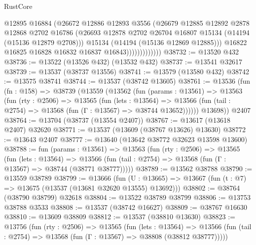 \begin{lexlean}{RustCore}
\begin{coremodule}
                            @12895
                            @16884
                            (@26672
                              @12886
                              @12893
                              @3556
                              (@26679
                                @12885
                                @12892
                                @2878
                                @12868
                                @2702
                                @16786
                                (@26693
                                  @12878
                                  @2702
                                  @26704
                                  @16807
                                  @15134
                                  (@14194 (@15136 @12879 @2708)))
                                @15134
                                (@14194 (@15136 @12869 @12885)))
                              @16822
                              @16825
                              @16828
                              @16832
                              @16837
                              @16843)))))))))))))
@38732 := @13520 @432
@38736 := @13522 (@13526 @432) (@13532 @432)
@38737 := @13541 @32617
@38739 := @13537 (@38737 @13556)
@38741 := @13579 (@13580 @432)
@38742 := @13575 @38741
@38744 := @13537 (@38742 @13605)
@38761 := @13536
    (fun (fn : @158) =>
    @38739
      (@13559
        (@13562
          (fun (params : @13561) =>
          @13563
            (fun (rty : @2506) =>
            @13565
              (fun (lets : @13564) =>
              @13566 (fun (tail : @2754) => @13568 (fun (Γ : @13567) => @38744 @13652))))))
        @13698))
    @2407
@38764 := @13704 (@38737 (@13554 @2407))
@38767 := @13617 (@13618 @2407) @32620
@38771 := @13537 (@13609 (@38767 @13626) @13630)
@38772 := @13643 @2407
@38777 := @13640 (@13642 @38772 @32623 @13598 @13600)
@38788 := fun (params : @13561) =>
  @13563
    (fun (rty : @2506) =>
    @13565
      (fun (lets : @13564) =>
      @13566 (fun (tail : @2754) => @13568 (fun (Γ : @13567) => @38744 (@38771 @38777)))))
@38789 := @13562 @38788
@38790 := @13559 @38789
@38799 := @13666
    (fun (U : @13665) => @13667 (fun (t : @7) => @13675 (@13537 (@13681 @32620 @13555) @13692)))
@38802 := @38764 (@38790 @38799) @32618
@38804 := @13522 @38789 @38799
@38806 := @13753 @38788 @3533
@38808 := @13537 (@38742 @16627)
@38809 := @38767 @16630
@38810 := @13609 @38809
@38812 := @13537 (@38810 @13630)
@38823 := @13756
    (fun (rty : @2506) =>
    @13565
      (fun (lets : @13564) =>
      @13566 (fun (tail : @2754) => @13568 (fun (Γ : @13567) => @38808 (@38812 @38777)))))

\end{coremodule}
\end{lexlean}
